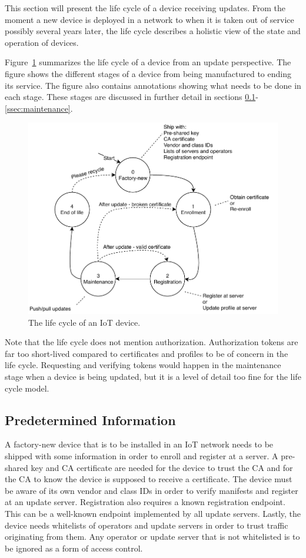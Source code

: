 \documentclass[0-thesis.tex]{subfiles}
\begin{document}
This section will present the life cycle of a device receiving updates. From the moment a
new device is deployed in a network to when it is taken out of service possibly several
years later, the life cycle describes a holistic view of the state and operation of
devices.

Figure~\ref{fig:lifecycle} summarizes the life cycle of a device from an update
perspective. The figure shows the different stages of a device from being manufactured to
ending its service. The figure also contains annotations showing what needs to be done in
each stage. These stages are discussed in further detail in sections
\ref{ssec:predetermined-information}-\ref{ssec:maintenance}. 

\begin{figure}[t]
    \caption{The life cycle of an IoT device.}
    \label{fig:lifecycle}
    \includegraphics{images/lifecycle.pdf}
\end{figure}

Note that the life cycle does not mention authorization. Authorization tokens are far too
short-lived compared to certificates and profiles to be of concern in the life cycle.
Requesting and verifying tokens would happen in the maintenance stage when a device is
being updated, but it is a level of detail too fine for the life cycle model.

\subsection{Predetermined Information}
\label{ssec:predetermined-information}
A factory-new device that is to be installed in an IoT network needs to be shipped with
some information in order to enroll and register at a server. A pre-shared key and CA
certificate are needed for the device to trust the CA and for the CA to know the device is
supposed to receive a certificate. The device must be aware of its own vendor and class
IDs in order to verify manifests and register at an update server. Registration also
requires a known registration endpoint. This can be a well-known endpoint implemented by
all update servers. Lastly, the device needs whitelists of operators and update servers in
order to trust traffic originating from them. Any operator or update server that is not
whitelisted is to be ignored as a form of access control.
\end{document}
